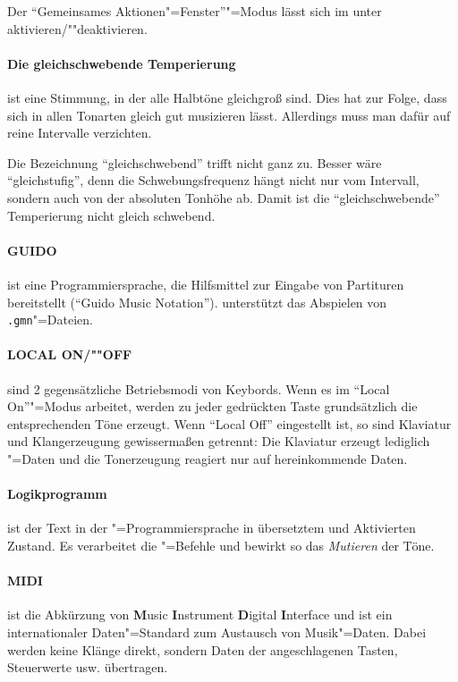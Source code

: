   Der "`Gemeinsames Aktionen"=Fenster"'"=Modus lässt sich im
   unter  aktivieren/""deaktivieren.

\paragraph{Die gleichschwebende Temperierung}\label{sec:MT_EQUAL} ist eine
  Stimmung, in der alle Halbtöne gleichgroß sind.  Dies hat zur Folge,
  dass sich in allen Tonarten gleich gut musizieren lässt.  Allerdings
  muss man dafür auf reine Intervalle verzichten. 

  Die Bezeichnung "`gleichschwebend"' trifft nicht ganz zu. Besser
  wäre "`gleichstufig"', denn die Schwebungsfrequenz hängt nicht nur
  vom Intervall, sondern auch von der absoluten Tonhöhe ab. Damit ist
  die "`gleichschwebende"' Temperierung nicht gleich schwebend.

\paragraph{GUIDO}\label{sec:DV_GUIDO} ist eine
  Programmiersprache, die Hilfsmittel zur Eingabe von Partituren
  bereitstellt ("`Guido Music Notation"'). \mutabor{} unterstützt das
  Abspielen von \texttt{.gmn}"=Dateien.

\paragraph{LOCAL ON/""OFF}\label{sec:DV_LOCAL} sind 2
  gegensätzliche Betriebsmodi von Keybords. Wenn es im "`Local
  On"'"=Modus arbeitet, werden zu jeder gedrückten Taste grundsätzlich
  die entsprechenden Töne erzeugt. Wenn "`Local Off"' eingestellt ist,
  so sind Klaviatur und Klangerzeugung gewissermaßen getrennt: Die
  Klaviatur erzeugt lediglich "=Daten und
  die Tonerzeugung reagiert nur auf hereinkommende Daten.

\paragraph{Logikprogramm}\label{sec:DV_LOGIKPROGRAMM} ist der
  Text in der \mutabor{}"=Programmiersprache in übersetztem und
  Aktivierten Zustand. Es verarbeitet die
  "=Befehle und bewirkt so das
  \emph{Mutieren} der Töne.

\paragraph{MIDI}\label{sec:DV_MIDI} ist die Abkürzung von
  \textbf{M}usic \textbf{I}nstrument \textbf{D}igital
  \textbf{I}nterface und ist ein internationaler Daten"=Standard zum
  Austausch von Musik"=Daten. Dabei werden keine Klänge direkt,
  sondern Daten der angeschlagenen Tasten, Steuerwerte usw.
  übertragen.

